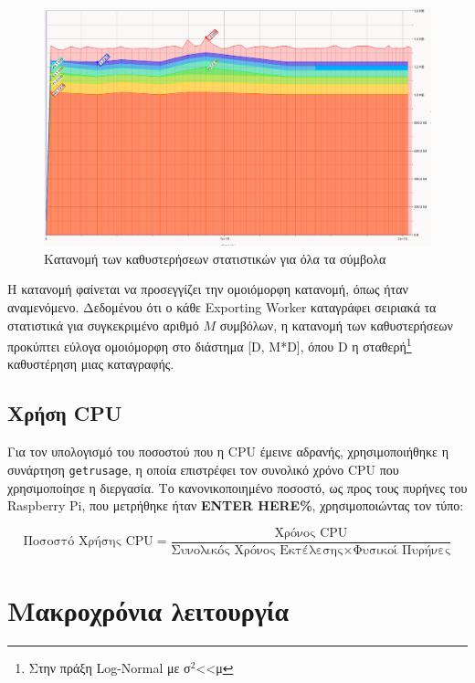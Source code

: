 \documentclass[12pt]{article}
\begin{document}
\begin{figure}[H]
    \centering
    \begin{minipage}{0.75\textwidth}
        \centering
        \includegraphics[width=\linewidth]{massif.png} %
        \caption{Κατανομή των καθυστερήσεων στατιστικών για όλα τα σύμβολα}
        \label{fig:massif}
    \end{minipage}
\end{figure}

Η κατανομή φαίνεται να προσεγγίζει την ομοιόμορφη κατανομή, όπως ήταν αναμενόμενο. Δεδομένου ότι ο κάθε Exporting Worker καταγράφει σειριακά τα στατιστικά για συγκεκριμένο αριθμό \( M \) συμβόλων, η κατανομή των καθυστερήσεων προκύπτει εύλογα ομοιόμορφη στο διάστημα [D, M*D], όπου D η σταθερή\footnote{Στην πράξη Log-Normal με σ\(^2\)<<μ} καθυστέρηση μιας καταγραφής.


\subsection{Χρήση CPU}

Για τον υπολογισμό του ποσοστού που η CPU έμεινε αδρανής, χρησιμοποιήθηκε η συνάρτηση \texttt{getrusage}, η οποία επιστρέφει τον συνολικό χρόνο CPU που χρησιμοποίησε η διεργασία. Το κανονικοποιημένο ποσοστό, ως προς τους πυρήνες του Raspberry Pi, που μετρήθηκε ήταν \textbf{ENTER HERE\%}, χρησιμοποιώντας τον τύπο:

\[
    \text{Ποσοστό Χρήσης CPU} = \frac{\text{Χρόνος CPU}}{\text{Συνολικός Χρόνος Εκτέλεσης} \times \text{Φυσικοί Πυρήνες}}
\]
\section{Μακροχρόνια λειτουργία}
\end{document}
